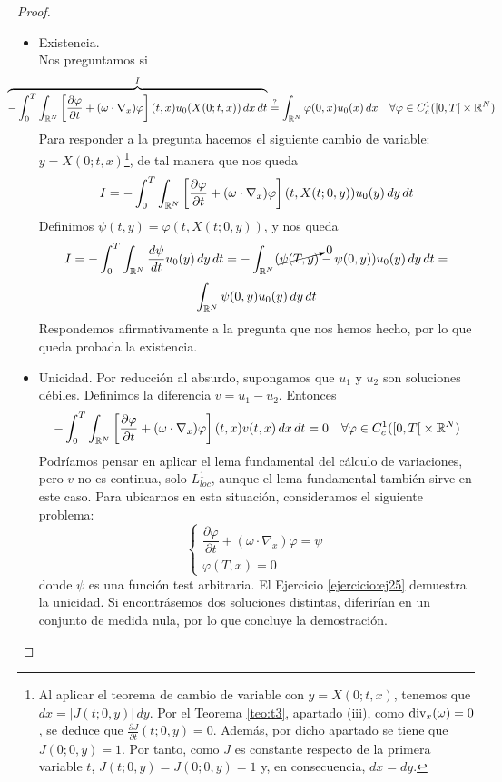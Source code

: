 \begin{proof}
    \begin{itemize}
        \item[$(i)$] Existencia. \\
        
        Nos preguntamos si 
        $$\hspace{-1cm} \overbrace{-\int_{0}^{T} \int_{\R^N} \left[ \dfrac{\partial \varphi}{\partial t} + (\omega \cdot \nabla_x) \varphi \right](t,x) u_0(X(0;t,x))\,dx\,dt}^{I}
        \stackrel{?}{=} \int_{\R^N} \varphi(0,x) u_0(x)\,dx \quad \forall \varphi \in C_c^1(\left[0,T \right[ \times \R^N)$$
        Para responder a la pregunta hacemos el siguiente cambio de variable: $y = X(0;t,x)$\footnote{Al aplicar el teorema de cambio de variable con $y=X(0;t,x)$, tenemos que 
        $dx=|J(t;0,y)|\,dy$. Por el Teorema \ref{teo:t3}, apartado (iii), como $\text{div}_x(\omega)=0$, se deduce que $\frac{\partial J}{\partial t}(t;0,y)=0$. Además, por dicho apartado se tiene que $J(0;0,y)=1$. Por tanto, como $J$ es constante respecto de la primera
        variable $t$, $J(t;0,y) = J(0;0,y) =1$ y, en consecuencia, $dx=dy$.}, de tal manera que nos queda
        $$I = -\int_{0}^{T} \int_{\mathbb{R}^N} \left[ \dfrac{\partial \varphi}{\partial t} + (\omega \cdot \nabla_x) \varphi \right] (t,X(t;0,y)) u_0(y)\,dy\,dt$$
        Definimos $\psi(t,y) = \varphi(t,X(t;0,y))$, y nos queda
        $$I = -\int_{0}^{T} \int_{\mathbb{R}^N} \dfrac{d \psi}{dt} u_0(y) \,dy\,dt = -\int_{\mathbb{R}^N} (\cancelto{0}{\psi(T,y)} - \psi(0,y)) u_0(y) \,dy\,dt =$$
        $$\int_{\mathbb{R}^N} \psi(0,y) u_0(y) \,dy\,dt$$
        Respondemos afirmativamente a la pregunta que nos hemos hecho, por lo que queda probada la existencia.

        \item[$(ii)$] Unicidad. Por reducción al absurdo, supongamos que $u_1$ y $u_2$ son soluciones débiles. Definimos la diferencia $v = u_1 - u_2$. Entonces
        $$-\int_{0}^{T} \int_{\mathbb{R}^N} \left[ \dfrac{\partial \varphi}{\partial t} + (\omega \cdot \nabla_x) \varphi \right](t,x) v(t,x) \,dx\,dt = 0 \quad \forall \varphi \in C_c^1(\left[0, T \right[ \times \mathbb{R}^N)$$
        Podríamos pensar en aplicar el lema fundamental del cálculo de variaciones, pero $v$ no es continua, solo $L^1_{loc}$, aunque el lema fundamental también
        sirve en este caso. Para ubicarnos en esta situación, consideramos el siguiente problema:
        $$\begin{cases}
            \dfrac{\partial \varphi}{\partial t} + (\omega \cdot \nabla_x) \varphi = \psi \\
            \varphi(T,x) = 0
        \end{cases}$$
        donde $\psi$ es una función test arbitraria. El Ejercicio \ref{ejercicio:ej25} demuestra la unicidad.
        Si encontrásemos dos soluciones distintas, diferirían en un conjunto de medida nula, por lo que concluye la demostración. \qedhere
    \end{itemize}
\end{proof}

